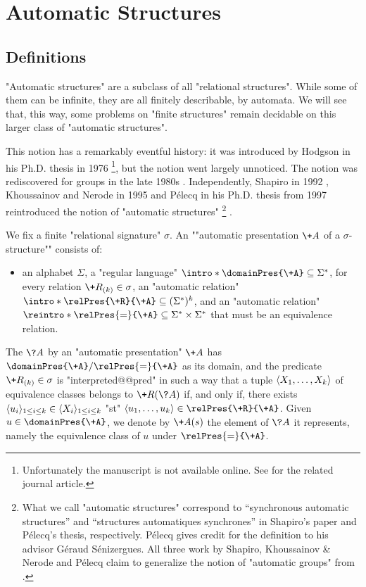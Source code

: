 \section{Automatic Structures}
\label{sec:preliminaries-automatic-structures-automatic-structures}

\subsection{Definitions}

"Automatic structures" are a subclass of all "relational structures".
While some of them can be infinite, they are all finitely describable, by
automata. We will see that, this way, some problems on "finite structures"
remain decidable on this larger class of "automatic structures".

This notion has a remarkably eventful history:
it was introduced by Hodgson in his Ph.D. thesis in 1976
\cite{Hodgson1976PhD}\footnote{Unfortunately the manuscript is not available online.
See \cite{Hodgson1983Decidabilite} for the related journal article.}, but
the notion went largely unnoticed. The notion was rediscovered for groups
in the late 1980s \cite{Epstein1992Word}. 
Independently, Shapiro in 1992 \cite{Shapiro1992AutomaticStructures},
Khoussainov and Nerode in 1995 \cite{KhoussainovNerode1995AutomaticPresentations}
and Pélecq in his Ph.D. thesis from 1997 reintroduced the notion of "automatic structures"%
\footnote{What we call "automatic structures"
correspond to ``synchronous automatic structures'' and ``structures automatiques synchrones'' in Shapiro's paper and Pélecq's thesis, respectively.
Pélecq gives credit for the definition to his advisor Géraud Sénizergues.
All three work by Shapiro, Khoussainov \& Nerode and Pélecq
claim to generalize the notion of "automatic groups" from \cite{Epstein1992Word}.}
\cite[\S~3.1.3, p.~91]{Pelecq1997Isomorphismes}.


We fix a finite "relational signature" $\sigma$.
An \AP""automatic presentation $\+A$ of a $\sigma$-structure"" consists of:
\begin{itemize}
	\item an alphabet $\Sigma$,
	\itemAP a "regular language" $\intro*\domainPres{\+A} \subseteq \Sigma^*$,
	\itemAP for every relation $\+R_{(k)} \in \sigma$, an
		"automatic relation" $\intro*\relPres{\+R}{\+A} \subseteq (\Sigma^*)^k$, and
	\itemAP an "automatic relation" $\reintro*\relPres{=}{\+A} \subseteq
		\Sigma^* \times \Sigma^*$ that must be an equivalence relation. 
\end{itemize} 
The \AP{} $\?A$ by an "automatic presentation" $\+A$ has
$\domainPres{\+A}/{\relPres{=}{\+A}}$ as its domain, and the predicate $\+R_{(k)} \in \sigma$
is "interpreted@@pred" in such a way that a tuple $\langle X_1,\dotsc,X_k\rangle$ of equivalence classes
belongs to $\+R(\?A)$ if, and only if, there exists $\langle u_i\rangle_{1 \leq i \leq k} \in\langle X_i\rangle_{1 \leq i \leq k}$ "st" $\tup{u_1,\dotsc,u_k} \in \relPres{\+R}{\+A}$.
Given $u \in \domainPres{\+A}$, we denote by $\+A(s)$ the element of $\?A$ it represents,
namely the equivalence class of $u$ under $\relPres{=}{\+A}$.


